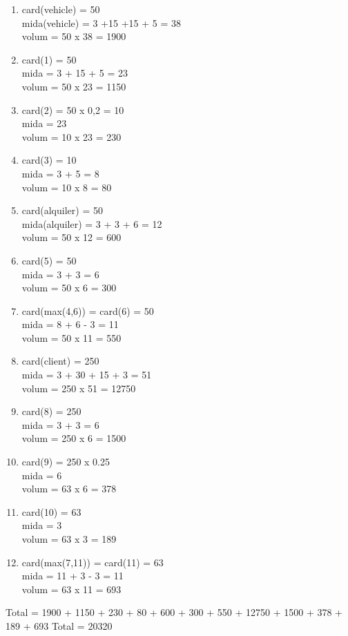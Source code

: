 \documentclass[12pt]{article}
\begin{document}
\begin{enumerate}
	\item 
	card(vehicle) = 50\\
	mida(vehicle) = 3 +15 +15 + 5 = 38\\
	volum = 50 x 38 = 1900
	\item 	card(1) = 50\\					
	mida =  3 + 15 + 5 = 23\\				
	volum = 50 x 23 = 1150	
	\item card(2) = 50 x 0,2 = 10			\\	
	mida = 23						\\
	volum = 10 x 23 = 230	
	\item card(3) = 10						\\
	mida = 3 + 5 = 8					\\
	volum = 10 x 8 = 80		
	\item card(alquiler) = 50					\\
	mida(alquiler) = 3 + 3 + 6 = 12			\\
	volum = 50 x 12 = 600	
	\item card(5) = 50						\\
	mida = 3 + 3 = 6					\\
	volum = 50 x 6 = 300		
	\item card(max(4,6)) = card(6) = 50 \\
				mida = 8 + 6 - 3 = 11\\
				volum = 50 x 11 = 550
	\item card(client) = 250\\
	mida =  3 + 30 + 15 + 3 = 51				\\
	volum = 250 x 51 = 12750				
	\item card(8) = 250 \\
	mida = 3 + 3 = 6\\
	volum = 250 x 6 = 1500
	\item card(9) = 250 x 0.25\\
	mida = 6\\
	volum = 63 x 6 = 378
	\item card(10) = 63\\
	mida = 3\\
	volum = 63 x 3 = 189
	\item card(max(7,11)) = card(11) = 63\\
	mida = 11 + 3 - 3 = 11\\
	volum = 63 x 11 = 693
	
\end{enumerate}
Total = 1900 + 1150 + 230 + 80 + 600 + 300 + 550 + 12750 + 1500 + 378 + 189 + 693
Total  = 20320
\end{document}
